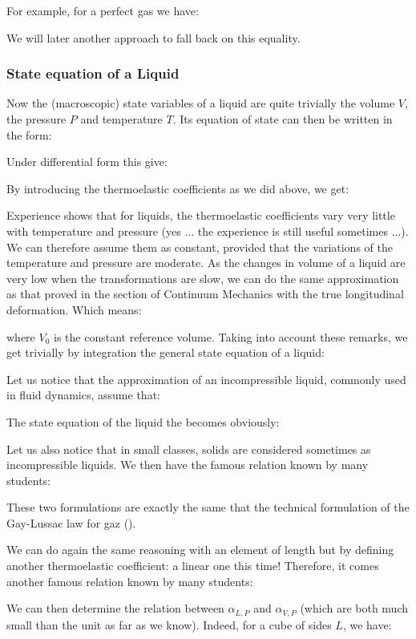 	For example, for a perfect gas we have:
	
	We will later another approach to fall back on this equality.
	
	\subsubsection{State equation of a Liquid}
	Now the (macroscopic) state variables of a liquid are quite trivially the volume $V$, the pressure $P$  and temperature $T$. Its equation of state can then be written in the form:
	
	Under differential form this give:
	
	By introducing the thermoelastic coefficients as we did above, we get:
	
	Experience shows that for liquids, the thermoelastic coefficients vary very little with temperature and pressure (yes ... the experience is still useful sometimes ...). We can therefore assume them as constant, provided that the variations of the temperature and pressure are moderate. As the changes in volume of a liquid are very low when the transformations are slow, we can do the same approximation as that proved in the section of Continuum Mechanics with the true longitudinal deformation. Which means:
	
	where $V_0$ is the constant reference volume. Taking into account these remarks, we get trivially by integration the general state equation of a liquid:
	
	Let us notice that the approximation of an incompressible liquid, commonly used in fluid dynamics, assume that:
	
	The state equation of the liquid the becomes obviously:
	
	Let us also notice that in small classes, solids are considered sometimes as incompressible liquids. We then have the famous relation known by many students:
	
	These two formulations are exactly the same that the technical formulation of the Gay-Lussac law for gaz ().

	We can do again the same reasoning with an element of length but by defining another thermoelastic coefficient: a linear one this time! Therefore, it comes another famous relation known by many students:
	
	We can then determine the relation between $\alpha_{L,P}$ and $\alpha_{V,P}$ (which are both much small than the unit as far as we know). Indeed, for a cube of sides $L$, we have:
	

